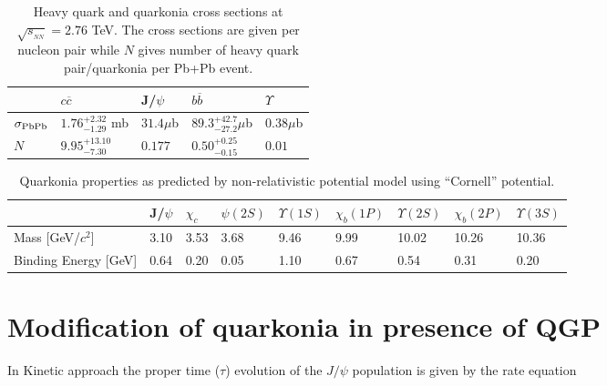 \documentclass[aps,prc,preprint,superscriptaddress,showpacs,showkeys]{revtex4-1}
\begin{document}
\begin{table}
\caption[]{Heavy quark and quarkonia cross sections at
$\sqrt{s_{_{NN}}}= 2.76$ TeV. The cross sections are given per nucleon pair while
$N$ gives number of heavy quark pair/quarkonia per Pb+Pb event.}
\label{NLOcros}
\begin{tabular}{l|l|l|l|l} 
\hline 
\hline
                     & $ c \overline c$           &J/$\psi$      & $ b \overline b$           & $\Upsilon$   \\              
\hline
$\sigma_{\rm PbPb}$  & $1.76^{+2.32}_{-1.29}$ mb  & $31.4 \mu$b  & $89.3^{+42.7}_{-27.2} \mu$b  & $0.38 \mu$b  \\
$N$                  &$9.95^{+13.10}_{-7.30}$     & $0.177$      & $0.50^{+0.25}_{-0.15}$     & $0.01$       \\
\hline
\hline
\end{tabular}
\end{table}


\begin{table}
\caption[]{Quarkonia properties as predicted by non-relativistic potential model using 
``Cornell'' potential\cite{YSuppAbdShuk}.}
\label{QuarkoniaProperties}
\begin{tabular}{l|l|l|l|l|l|l|l|l} 
\hline   
\hline
    &J/$\psi$  &$\chi_c$  &$\psi(2S)$ &$\Upsilon(1S)$ &$\chi_b(1P)$ &$\Upsilon(2S)$ &$\chi_b(2P)$ &$\Upsilon(3S)$ \\ 
\hline 
Mass [GeV/$c^2$]                      &3.10     &3.53  &3.68  &9.46  &9.99  &10.02  &10.26   &10.36 \\
Binding Energy [GeV]                  &0.64     &0.20  &0.05  &1.10  &0.67  &0.54   &0.31    &0.20 \\
\hline
\hline
\end{tabular}
\end{table}


\section{Modification of quarkonia in presence of QGP}
In Kinetic approach \cite{Thews} the proper time ($\tau$) evolution of the $J/\psi$ population is given by the rate equation 
\end{document}
